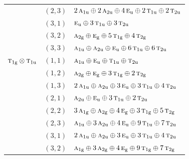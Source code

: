 \documentclass[11pt]{article}
\newcommand{\irr}[1]{\text{\normalfont\scshape #1}}
\newcommand{\ptag}[1]{\mathrm{#1}}
\begin{document}
\begin{longtable}{p{} c p{}}
 & $(2,3)$ & $2\,\irr{a}_{1\ptag{u}}\oplus 2\,\irr{a}_{2\ptag{u}}\oplus 4\,\irr{e}_{\ptag{u}}\oplus 2\,\irr{t}_{1\ptag{u}}\oplus 2\,\irr{t}_{2\ptag{u}}$\\

 & $(3,1)$ & $\irr{e}_{\ptag{u}}\oplus 3\,\irr{t}_{1\ptag{u}}\oplus 3\,\irr{t}_{2\ptag{u}}$\\

 & $(3,2)$ & $\irr{a}_{2\ptag{g}}\oplus \irr{e}_{\ptag{g}}\oplus 5\,\irr{t}_{1\ptag{g}}\oplus 4\,\irr{t}_{2\ptag{g}}$\\

 & $(3,3)$ & $\irr{a}_{1\ptag{u}}\oplus \irr{a}_{2\ptag{u}}\oplus \irr{e}_{\ptag{u}}\oplus 6\,\irr{t}_{1\ptag{u}}\oplus 6\,\irr{t}_{2\ptag{u}}$\\

\hline

$\irr{t}_{1\ptag{g}}\otimes \irr{t}_{1\ptag{u}}$ & $(1,1)$ & $\irr{a}_{1\ptag{u}}\oplus \irr{e}_{\ptag{u}}\oplus \irr{t}_{1\ptag{u}}\oplus \irr{t}_{2\ptag{u}}$\\

 & $(1,2)$ & $\irr{a}_{2\ptag{g}}\oplus \irr{e}_{\ptag{g}}\oplus 3\,\irr{t}_{1\ptag{g}}\oplus 2\,\irr{t}_{2\ptag{g}}$\\

 & $(1,3)$ & $2\,\irr{a}_{1\ptag{u}}\oplus \irr{a}_{2\ptag{u}}\oplus 3\,\irr{e}_{\ptag{u}}\oplus 3\,\irr{t}_{1\ptag{u}}\oplus 4\,\irr{t}_{2\ptag{u}}$\\

 & $(2,1)$ & $\irr{a}_{2\ptag{u}}\oplus \irr{e}_{\ptag{u}}\oplus 3\,\irr{t}_{1\ptag{u}}\oplus 2\,\irr{t}_{2\ptag{u}}$\\

 & $(2,2)$ & $3\,\irr{a}_{1\ptag{g}}\oplus \irr{a}_{2\ptag{g}}\oplus 4\,\irr{e}_{\ptag{g}}\oplus 3\,\irr{t}_{1\ptag{g}}\oplus 5\,\irr{t}_{2\ptag{g}}$\\

 & $(2,3)$ & $\irr{a}_{1\ptag{u}}\oplus 3\,\irr{a}_{2\ptag{u}}\oplus 4\,\irr{e}_{\ptag{u}}\oplus 9\,\irr{t}_{1\ptag{u}}\oplus 7\,\irr{t}_{2\ptag{u}}$\\

 & $(3,1)$ & $2\,\irr{a}_{1\ptag{u}}\oplus \irr{a}_{2\ptag{u}}\oplus 3\,\irr{e}_{\ptag{u}}\oplus 3\,\irr{t}_{1\ptag{u}}\oplus 4\,\irr{t}_{2\ptag{u}}$\\

 & $(3,2)$ & $\irr{a}_{1\ptag{g}}\oplus 3\,\irr{a}_{2\ptag{g}}\oplus 4\,\irr{e}_{\ptag{g}}\oplus 9\,\irr{t}_{1\ptag{g}}\oplus 7\,\irr{t}_{2\ptag{g}}$\\


\end{longtable}
\end{document}
